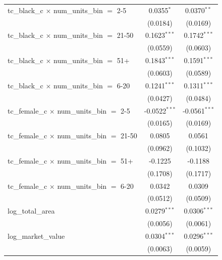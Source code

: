 \begin{tabular}{lcc}
   tc\_black\_c $\times$ num\_units\_bin $=$ 2-5         & 0.0355$^{*}$    & 0.0370$^{**}$\\   
                                                         & (0.0184)        & (0.0169)\\   
   tc\_black\_c $\times$ num\_units\_bin $=$ 21-50       & 0.1623$^{***}$  & 0.1742$^{***}$\\   
                                                         & (0.0559)        & (0.0603)\\   
   tc\_black\_c $\times$ num\_units\_bin $=$ 51+         & 0.1843$^{***}$  & 0.1591$^{***}$\\   
                                                         & (0.0603)        & (0.0589)\\   
   tc\_black\_c $\times$ num\_units\_bin $=$ 6-20        & 0.1241$^{***}$  & 0.1311$^{***}$\\   
                                                         & (0.0427)        & (0.0484)\\   
   tc\_female\_c $\times$ num\_units\_bin $=$ 2-5        & -0.0522$^{***}$ & -0.0561$^{***}$\\   
                                                         & (0.0165)        & (0.0169)\\   
   tc\_female\_c $\times$ num\_units\_bin $=$ 21-50      & 0.0805          & 0.0561\\   
                                                         & (0.0962)        & (0.1032)\\   
   tc\_female\_c $\times$ num\_units\_bin $=$ 51+        & -0.1225         & -0.1188\\   
                                                         & (0.1708)        & (0.1717)\\   
   tc\_female\_c $\times$ num\_units\_bin $=$ 6-20       & 0.0342          & 0.0309\\   
                                                         & (0.0512)        & (0.0509)\\   
   log\_total\_area                                      & 0.0279$^{***}$  & 0.0306$^{***}$\\   
                                                         & (0.0056)        & (0.0061)\\   
   log\_market\_value                                    & 0.0304$^{***}$  & 0.0296$^{***}$\\   
                                                         & (0.0063)        & (0.0059)\\   

\end{tabular}
